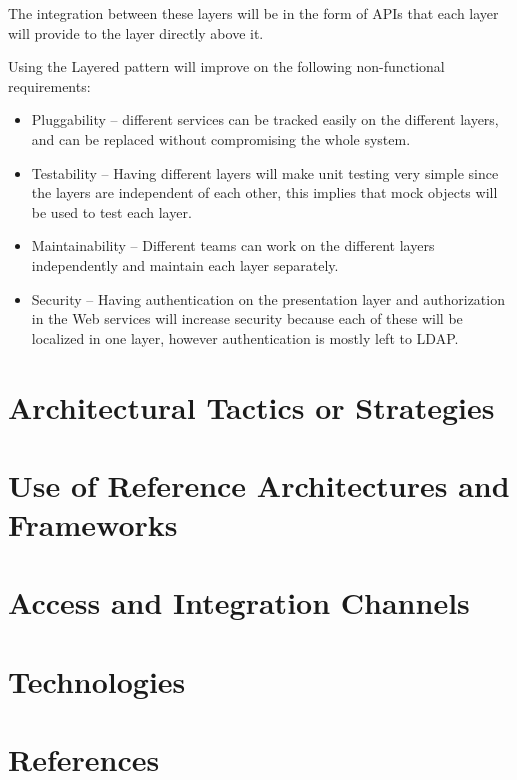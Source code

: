 \documentclass[a4paper]{article}
\begin{document}
The integration between these layers will be in the form of APIs that each layer will provide to the layer directly above it.

Using the Layered pattern will improve on the following non-functional requirements:
\begin{itemize}
			\item Pluggability – different services can be tracked easily on the different layers, and can be replaced without compromising the whole system.
			\item Testability – Having different layers will make unit testing very simple since the layers are independent of each other, this implies that mock objects will be used to test each layer.
			\item Maintainability – Different teams can work on the different layers independently and maintain each layer separately.
			\item Security – Having authentication on the presentation layer and authorization in the Web services will increase security because each of these will be localized in one layer, however authentication is mostly left to LDAP.   \\[1em]
\end{itemize}


\section{Architectural Tactics or Strategies}

\section{Use of Reference Architectures and Frameworks}

\section{Access and Integration Channels}

\section{Technologies}

\section{References}
\end{document}
